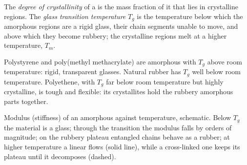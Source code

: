 \begin{definition}\label{def:b2:polymer-synthesis:transitions}
The \emph{degree of crystallinity} of a  is the mass fraction of
it that lies in crystalline regions. The \emph{glass transition temperature}
$T_g$ is the temperature below which the amorphous regions are a rigid glass, their chain
segments unable to move, and above which they become rubbery; the crystalline regions melt at a higher
temperature, $T_m$.
\end{definition}

Polystyrene and poly(methyl methacrylate) are amorphous with $T_g$ above room temperature: rigid,
transparent glasses. Natural rubber has $T_g$ well below room temperature. Polyethene, with $T_g$ far
below room temperature but highly crystalline, is tough and flexible: its crystallites hold the rubbery
amorphous parts together.

\begin{omfigure}
\par\vspace{4pt}

{\small Modulus (stiffness) of an amorphous  against temperature, schematic. Below $T_g$ the
material is a glass; through the transition the modulus falls by orders of magnitude; on the rubbery
plateau entangled chains behave as a rubber; at higher temperature a linear  flows (solid
line), while a cross-linked one keeps its plateau until it decomposes (dashed).}
\end{omfigure}

